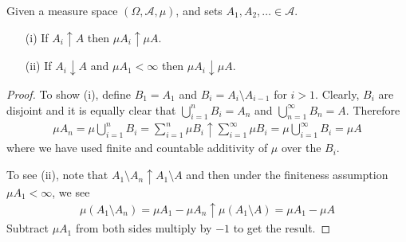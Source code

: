 \begin{lem}\label{ContinuityOfMeasure}Given a measure space $(\Omega, \mathcal{A}, \mu)$, and sets $A_1, A_2, \dots \in \mathcal{A}$.
\begin{itemize}
\item[(i)] If $A_i \uparrow A$ then $\mu A_i \uparrow \mu A$.
\item[(ii)] If $A_i \downarrow A$ and $\mu A_1 < \infty$ then $\mu A_i \downarrow \mu A$.
\end{itemize}
\end{lem}
\begin{proof}To show (i), define $B_1 = A_1$ and $B_i = A_i \setminus
  A_{i-1}$ for $i > 1$.  Clearly, $B_i$ are disjoint and it is equally
  clear that $\bigcup_{i=1}^n B_i = A_n$ and $\bigcup_{n=1} ^\infty
  B_n = A$.
Therefore
\begin{align*}
\mu A_n = \mu \bigcup_{i=1}^n B_i = \sum_{i=1}^n \mu B_i \uparrow
\sum_{i=1}^\infty \mu B_i = \mu \bigcup_{i=1}^\infty  B_i = \mu A
\end{align*}
where we have used finite and countable additivity of $\mu$ over the
$B_i$.

To see (ii), note that $A_1 \setminus A_n \uparrow A_1
\setminus A$ and then under the finiteness assumption $\mu A_1 <
\infty$, we see 
\begin{align*}
\mu (A_1 \setminus A_n) = \mu A_1 - \mu A_n \uparrow
\mu (A_1 \setminus A) = \mu A_1 - \mu A
\end{align*}
Subtract $\mu A_1$ from both sides multiply by $-1$ to get the result.
\end{proof}

